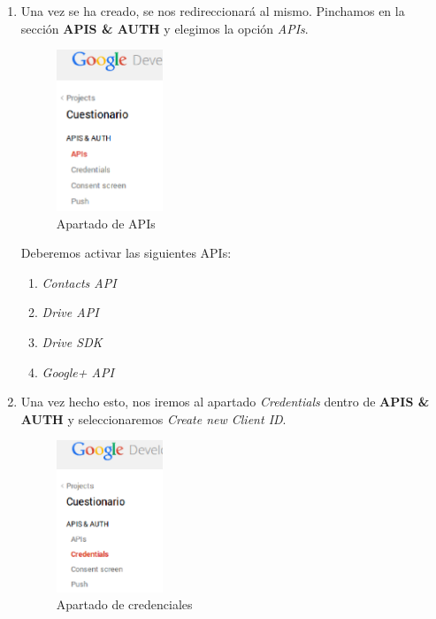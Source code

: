 \begin{enumerate}
  \item Una vez se ha creado, se nos redireccionar\'a al mismo. Pinchamos en la secci\'on {\bfseries APIS \& AUTH} y elegimos la opci\'on \textit{APIs}.
  \begin{figure}[!th]
  \begin{center}
  \includegraphics[width=0.3\textwidth]{images/gdc2.eps}
  \caption{Apartado de APIs}
  \label{fig:gdc2}
  \end{center}
  \end{figure}
    
  Deberemos activar las siguientes APIs:
  \begin{enumerate}
    \item \textit{Contacts API}
    \item \textit{Drive API}
    \item \textit{Drive SDK}
    \item \textit{Google+ API}
  \end{enumerate}
  \newpage
  
  \item Una vez hecho esto, nos iremos al apartado \textit{Credentials} dentro de {\bfseries APIS \& AUTH} y seleccionaremos \textit{Create new Client ID}.
  \begin{figure}[!th]
  \begin{center}
  \includegraphics[width=0.3\textwidth]{images/gdc3.eps}
  \caption{Apartado de credenciales}
  \label{fig:gdc3}
  \end{center}
  \end{figure}
  

\end{enumerate}
